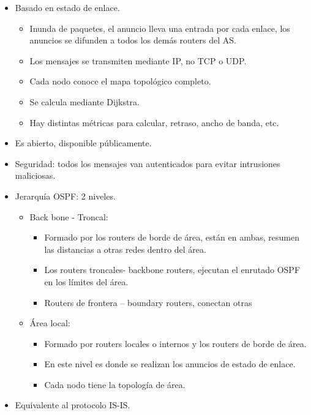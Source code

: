 \documentclass[12pt, twoside, openright]{report} %
\begin{document}
\begin{itemize}
	\item Basado en estado de enlace.

	      \begin{itemize}
		      \item Inunda de paquetes, el anuncio lleva una entrada por cada
		            enlace, los anuncios se difunden a todos los demás routers del
		            AS.
		      \item Los mensajes se transmiten mediante IP, no TCP o UDP.
		      \item Cada nodo conoce el mapa topológico completo.
		      \item Se calcula mediante Dijkstra.
		      \item Hay distintas métricas para calcular, retraso, ancho de banda,
		            etc.
	      \end{itemize}
	\item Es abierto, disponible públicamente.
	\item Seguridad: todos los mensajes van autenticados para evitar
	      intrusiones maliciosas.
	\item Jerarquía OSPF: 2 niveles.

	      \begin{itemize}
		      \item Back bone - Troncal:

		            \begin{itemize}
			            \item Formado por los routers de borde de área, están en ambas,
			                  resumen las distancias a otras redes dentro del área.
			            \item Los routers troncales- backbone routers, ejecutan el
			                  enrutado OSPF en los límites del área.
			            \item Routers de frontera -- boundary routers, conectan otras
		            \end{itemize}
		      \item Área local:

		            \begin{itemize}
			            \item Formado por routers locales o internos y los routers de
			                  borde de área.
			            \item En este nivel es donde se realizan los anuncios de estado de
			                  enlace.
			            \item Cada nodo tiene la topología de área.
		            \end{itemize}
	      \end{itemize}
	\item Equivalente al protocolo IS-IS.
\end{itemize}
\end{document}
